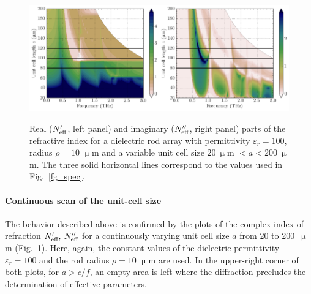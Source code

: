 \begin{figure}%
\caption{Real ($N_{\text{eff} }'$, left panel) and imaginary ($N_{\text{eff} }''$, right panel) parts of the refractive index for a dielectric rod array with permittivity $\varepsilon_r =100$, radius $\rho = 10$ $\upmu$m and a variable unit cell size $20\:\upmu$m $<a<200\:\upmu$m.  The three solid horizontal lines correspond to the values used in Fig.~\ref{fg_spec}.} \centering 
\label{fg_spacingscan100} 
\includegraphics[width=0.5\textwidth]{img/ERods_eps100_spacingscan_Nre.pdf}\includegraphics[width=0.5\textwidth]{img/ERods_eps100_spacingscan_Nim.pdf}
\end{figure}


\paragraph{Continuous scan of the unit-cell size}%
The behavior described above is confirmed by the plots of the complex index of refraction $N_{\text{eff} }',\: N_{\text{eff} }''$ for a continuously varying unit cell size $a$ from 20 to 200~$\upmu$m (Fig.~\ref{fg_spacingscan100}). Here, again, the constant values of the dielectric permittivity $\varepsilon_r=100$ and the rod radius $\rho=10$ $\upmu$m are used. In the upper-right corner of both plots, for $a>c/f$, an empty area is left where the diffraction precludes the determination of effective parameters. 

